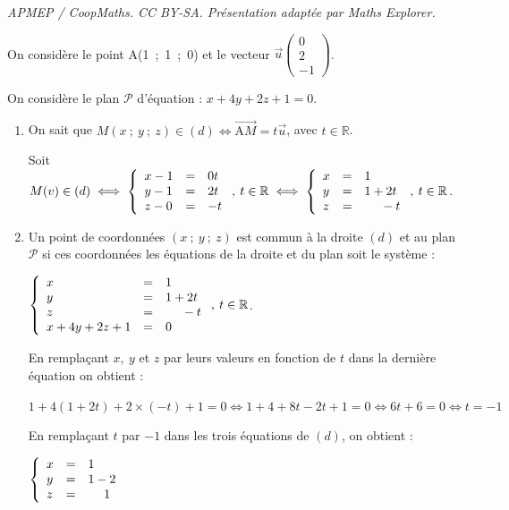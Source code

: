 \documentclass[10pt]{article}
\providecommand{\R}{\mathbb{R}}
\providecommand{\vect}[1]{\overrightarrow{#1}}
\begin{document}
\noindent\textit{APMEP / CoopMaths. CC BY-SA. Présentation adaptée par Maths Explorer.}\par\medskip
\medskip



On considère le point A(1~;~1~;~0) et le vecteur $\vect{u}\begin{pmatrix}0\\2\\- 1\end{pmatrix}$.

On considère le plan $\mathcal{P}$ d'équation : $x + 4y + 2z + 1 = 0$.

\medskip

\begin{enumerate}
\item 


On sait que $M(x~;~y~;~z) \in (d) \iff \vect{\text{A}M} = t \vect{u}$, avec $t \in \R$.

Soit $M(v) \in (d) \iff \left\{\begin{array}{l c l}
x - 1&=&0t\\
y - 1&=&2t\\
z - 0&=&-t
\end{array}\right., \: t \in \R \iff \left\{\begin{array}{l c l}
x &=&1\\
y&=&1 + 2t\\
z&=&\phantom{1 + } -t
\end{array}\right., \: t \in \R$.
\item 
Un point de coordonnées $(x~;~y~;~z)$ est commun à la droite $(d)$ et au plan $\mathcal{P}$ si ces coordonnées les équations de la droite et du plan soit le système :

$\left\{\begin{array}{l c l}
x &=&1\\
y&=&1 + 2t\\
z&=&\phantom{1 + } -t\\
x + 4y + 2z + 1&=&0
\end{array}\right., \: t \in \R$.

En remplaçant $x, \:y$ et $z$ par leurs valeurs en fonction de $t$ dans la dernière équation on obtient :

$1 + 4(1 + 2t) + 2\times (- t) + 1 = 0 \iff 1 + 4 + 8t - 2t + 1 = 0 \iff 6t + 6 = 0 \iff t = - 1$

En remplaçant $t$ par $- 1$ dans les trois équations de $(d)$, on obtient :

$\left\{\begin{array}{l c l}
x &=&1\\
y&=&1 - 2\\
z&=&\phantom{1 + } 1
\end{array}\right.$


\end{enumerate}
\end{document}
